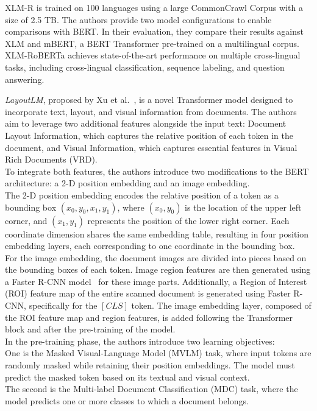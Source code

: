 XLM-R is trained on 100 languages using a large CommonCrawl Corpus with a size of 2.5 TB. The authors provide two model configurations to enable comparisons with BERT. In their evaluation, they compare their results against XLM and mBERT, a BERT Transformer pre-trained on a multilingual corpus. XLM-RoBERTa achieves state-of-the-art performance on multiple cross-lingual tasks, including cross-lingual classification, sequence labeling, and question answering.\par
\textit{LayoutLM}, proposed by Xu et al.~\cite{xu2020layoutlm}, is a novel Transformer model designed to incorporate text, layout, and visual information from documents. The authors aim to leverage two additional features alongside the input text: Document Layout Information, which captures the relative position of each token in the document, and Visual Information, which captures essential features in Visual Rich Documents (VRD).\\
To integrate both features, the authors introduce two modifications to the BERT architecture: a 2-D position embedding and an image embedding.\\
The 2-D position embedding encodes the relative position of a token as a bounding box $(x_0, y_0, x_1, y_1)$, where $(x_0, y_0)$ is the location of the upper left corner, and $(x_1, y_1)$ represents the position of the lower right corner. Each coordinate dimension shares the same embedding table, resulting in four position embedding layers, each corresponding to one coordinate in the bounding box.\\
For the image embedding, the document images are divided into pieces based on the bounding boxes of each token. Image region features are then generated using a Faster R-CNN model~\cite{girshick2015fast} for these image parts. Additionally, a Region of Interest (ROI) feature map of the entire scanned document is generated using Faster R-CNN, specifically for the $[CLS]$ token. The image embedding layer, composed of the ROI feature map and region features, is added following the Transformer block and after the pre-training of the model.\\
In the pre-training phase, the authors introduce two learning objectives:\\
One is the Masked Visual-Language Model (MVLM) task, where input tokens are randomly masked while retaining their position embeddings. The model must predict the masked token based on its textual and visual context.\\
The second is the Multi-label Document Classification (MDC) task, where the model predicts one or more classes to which a document belongs.\\
